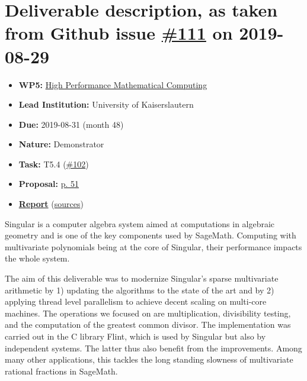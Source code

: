 \hypertarget{deliverable-description-as-taken-from-github-issue-111-on-2019-08-29}{%
\section*{\texorpdfstring{Deliverable description, as taken from Github
issue
\href{https://github.com/OpenDreamKit/OpenDreamKit/issues/111}{\#111} on
2019-08-29}{Deliverable description, as taken from Github issue \#111 on 2019-08-29}}\label{deliverable-description-as-taken-from-github-issue-111-on-2019-08-29}}

\begin{itemize}
\tightlist
\item
  \textbf{WP5:}
  \href{https://github.com/OpenDreamKit/OpenDreamKit/tree/master/WP5}{High
  Performance Mathematical Computing}
\item
  \textbf{Lead Institution:} University of Kaiserslautern
\item
  \textbf{Due:} 2019-08-31 (month 48)
\item
  \textbf{Nature:} Demonstrator
\item
  \textbf{Task:} T5.4
  (\href{https://github.com/OpenDreamKit/OpenDreamKit/issues/102}{\#102})
\item
  \textbf{Proposal:}
  \href{https://github.com/OpenDreamKit/OpenDreamKit/raw/master/Proposal/proposal-www.pdf}{p.
  51}
\item
  \textbf{\href{https://github.com/OpenDreamKit/OpenDreamKit/raw/master/WP5/D5.13/report-final.pdf}{Report}}
  (\href{https://github.com/OpenDreamKit/OpenDreamKit/raw/master/WP5/D5.13/}{sources})
\end{itemize}

Singular is a computer algebra system aimed at computations in algebraic
geometry and is one of the key components used by SageMath. Computing
with multivariate polynomials being at the core of Singular, their
performance impacts the whole system.

The aim of this deliverable was to modernize Singular's sparse
multivariate arithmetic by 1) updating the algorithms to the state of
the art and by 2) applying thread level parallelism to achieve decent
scaling on multi-core machines. The operations we focused on are
multiplication, divisibility testing, and the computation of the
greatest common divisor. The implementation was carried out in the C
library Flint, which is used by Singular but also by independent
systems. The latter thus also benefit from the improvements. Among many
other applications, this tackles the long standing slowness of
multivariate rational fractions in SageMath.
